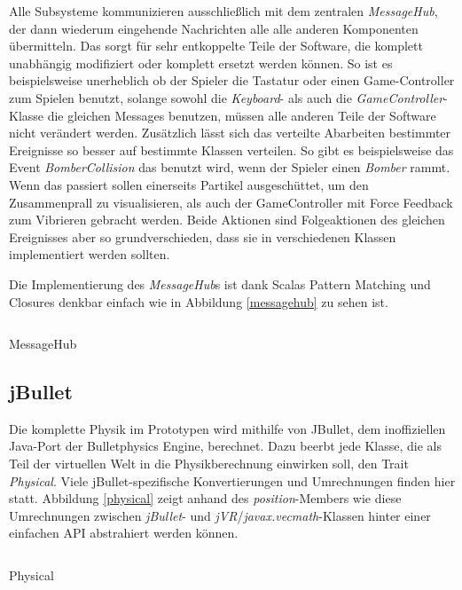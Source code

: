 \documentclass[a4paper]{article}
\begin{document}
\newpage
Alle Subsysteme kommunizieren ausschließlich mit dem zentralen \textit{MessageHub}, der dann wiederum eingehende Nachrichten alle alle anderen Komponenten übermitteln. Das sorgt für sehr entkoppelte Teile der Software, die komplett unabhängig modifiziert oder komplett ersetzt werden können. So ist es beispielsweise unerheblich ob der Spieler die Tastatur oder einen Game-Controller zum Spielen benutzt, solange sowohl die \textit{Keyboard}- als auch die \textit{GameController}-Klasse die gleichen Messages benutzen, müssen alle anderen Teile der Software nicht verändert werden. Zusätzlich lässt sich das verteilte Abarbeiten bestimmter Ereignisse so besser auf bestimmte Klassen verteilen. So gibt es beispielsweise das Event \textit{BomberCollision} das benutzt wird, wenn der Spieler einen \textit{Bomber} rammt. Wenn das passiert sollen einerseits Partikel ausgeschüttet, um den Zusammenprall zu visualisieren, als auch der GameController mit Force Feedback zum Vibrieren gebracht werden. Beide Aktionen sind Folgeaktionen des gleichen Ereignisses aber so grundverschieden, dass sie in verschiedenen Klassen implementiert werden sollten.

Die Implementierung des \textit{MessageHub}s ist dank Scalas Pattern Matching und Closures denkbar einfach wie in Abbildung \ref{messagehub} zu sehen ist.

\begin{listing}[H]
\inputminted[firstline=3]{scala}{../scala/org/whiskeysierra/powpow/MessageHub.scala}
\caption{MessageHub}
\label{messagehub}
\end{listing}

\subsection{jBullet}
Die komplette Physik im Prototypen wird mithilfe von JBullet, dem inoffiziellen Java-Port der Bulletphysics Engine, berechnet. Dazu beerbt jede Klasse, die als Teil der virtuellen Welt in die Physikberechnung einwirken soll, den Trait \textit{Physical}. Viele jBullet-spezifische Konvertierungen und Umrechnungen finden hier statt. Abbildung \ref{physical} zeigt anhand des \textit{position}-Members wie diese Umrechnungen zwischen \textit{jBullet}- und \textit{jVR}/\textit{javax.vecmath}-Klassen hinter einer einfachen API abstrahiert werden können.

\begin{listing}[H]
\inputminted[firstline=25, lastline=34]{scala}{../scala/org/whiskeysierra/powpow/Physical.scala}
\caption{Physical}
\label{physical}
\end{listing}
\end{document}
